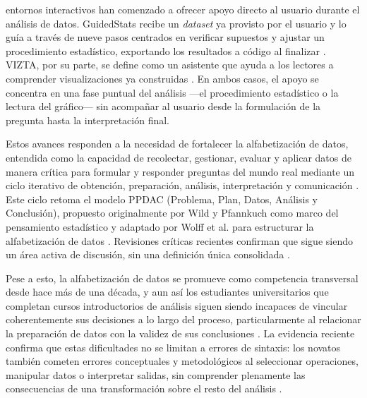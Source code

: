 \documentclass[10pt,journal,compsoc]{IEEEtran}
\begin{document}

 entornos interactivos han comenzado a ofrecer apoyo
directo al usuario durante el análisis de datos. GuidedStats recibe un
\textit{dataset} ya provisto por el usuario y lo guía a través de nueve pasos
centrados en verificar supuestos y ajustar un procedimiento estadístico,
exportando los resultados a código al finalizar \cite{zhang2024}. VIZTA, por
su parte, se define como un asistente que ayuda a los lectores a comprender
visualizaciones ya construidas \cite{wang2025}. En ambos casos, el apoyo se
concentra en una fase puntual del análisis —el procedimiento estadístico o la
lectura del gráfico— sin acompañar al usuario desde la formulación de la
pregunta hasta la interpretación final.

Estos avances responden a la necesidad de fortalecer la alfabetización de
datos, entendida como la capacidad de recolectar, gestionar, evaluar y
aplicar datos de manera crítica para formular y responder preguntas del
mundo real mediante un ciclo iterativo de obtención, preparación, análisis,
interpretación y comunicación \cite{wolff2016}. Este ciclo retoma el modelo
PPDAC (Problema, Plan, Datos, Análisis y Conclusión), propuesto originalmente
por Wild y Pfannkuch como marco del pensamiento estadístico
\cite{wildpfannkuch1999} y adaptado por Wolff et al. para estructurar la
alfabetización de datos \cite{wolff2016}. Revisiones críticas recientes
confirman que sigue siendo un área activa de discusión, sin una definición
única consolidada \cite{lund2025}.

Pese a esto, la alfabetización de datos se promueve como competencia
transversal desde hace más de una década, y aun así los estudiantes
universitarios que completan cursos introductorios de análisis siguen siendo
incapaces de vincular coherentemente sus decisiones a lo largo del proceso,
particularmente al relacionar la preparación de datos con la validez de sus
conclusiones \cite{wolff2016}. La evidencia reciente confirma que estas
dificultades no se limitan a errores de sintaxis: los novatos también
cometen errores conceptuales y metodológicos al seleccionar operaciones,
manipular datos o interpretar salidas, sin comprender plenamente las
consecuencias de una transformación sobre el resto del análisis
\cite{singh2024,neuwinger2025}.
\end{document}
